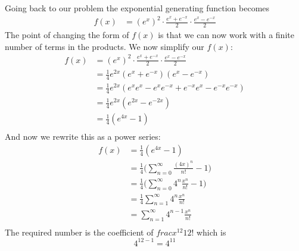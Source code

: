 Going back to our problem the exponential generating function becomes
\begin{align*}
f(x)
&= (e^x)^2 \cdot \frac{e^x + e^{-x}}{2} \cdot \frac{e^x - e^{-x}}{2}
\end{align*}
The point of changing the form of $f(x)$ is that we can now work with a finite
number of terms in the products.
We now simplify our $f(x)$:
\begin{align*}
f(x)
&= (e^x)^2 \cdot \frac{e^x + e^{-x}}{2} \cdot \frac{e^x - e^{-x}}{2} \\
&= \frac{1}{4} e^{2x}(e^x + e^{-x})(e^x - e^{-x}) \\
&= \frac{1}{4} e^{2x}(e^xe^x - e^xe^{-x} + e^{-x}e^x - e^{-x}e^{-x}) \\
&= \frac{1}{4} e^{2x}(e^{2x} - e^{-2x}) \\
&= \frac{1}{4} (e^{4x} - 1) \\
\end{align*}
And now we rewrite this as a power series:
\begin{align*}
f(x)
&= \frac{1}{4} (e^{4x} - 1) \\
&= \frac{1}{4} \biggl(  \sum_{n=0}^\infty \frac{(4x)^n}{n!} - 1 \biggr) \\
&= \frac{1}{4} \biggl(  \sum_{n=0}^\infty 4^n \frac{x^n}{n!} - 1 \biggr) \\
&= \frac{1}{4} \sum_{n=1}^\infty 4^n \frac{x^n}{n!} \\
&= \sum_{n=1}^\infty 4^{n-1} \frac{x^n}{n!} \\
\end{align*}
The required number is the coefficient of $frac{x^{12}}{12!}$ which is
\[
4^{12-1} = 4^{11}
\]

